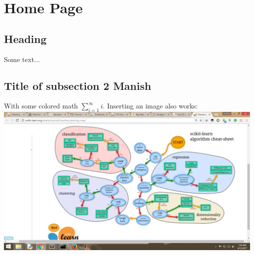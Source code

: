 \section{Home Page}
\subsection*{Heading}
Some text...
\subsection*{Title of subsection 2 Manish}
With some colored math $\sum_{i=1}^\infty i$.
Inserting an image also works:\\
\includegraphics[width=\linewidth]{yourimage.png}